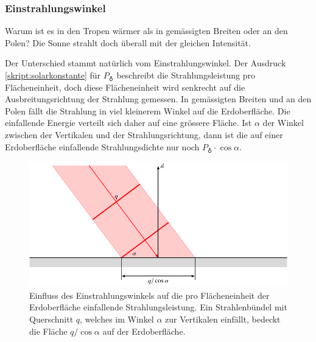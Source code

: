 \subsubsection{Einstrahlungswinkel}
Warum ist es in den Tropen wärmer als in gemässigten Breiten oder
an den Polen?
Die Sonne strahlt doch überall mit der gleichen Intensität.

Der Unterschied stammt natürlich vom Einstrahlungswinkel.
Der Ausdruck \eqref{skript:solarkonstante} für $P_{\earth}$ 
beschreibt die Strahlungsleistung pro Flächeneinheit, doch diese
Flächeneinheit wird senkrecht auf die Ausbreitungsrichtung der
Strahlung gemessen.
In gemässigten Breiten und an den Polen fällt die Strahlung 
in viel kleinerem Winkel auf die Erdoberfläche.
Die einfallende Energie verteilt sich daher auf eine grössere
Fläche.
Ist $\alpha$ der Winkel zwischen der Vertikalen und der Strahlungsrichtung,
dann ist die auf einer Erdoberfläche einfallende Strahlungsdichte nur
noch $P_{\earth}\cdot\cos\alpha$.

\begin{figure}
\centering
\includegraphics{chapters/1/einfall.pdf}
\caption{Einfluss des Einstrahlungswinkels auf die pro Flächeneinheit
der Erdoberfläche einfallende Strahlungsleistung.
Ein Strahlenbündel mit Querschnitt $q$, welches im Winkel
$\alpha$ zur Vertikalen einfällt, bedeckt die Fläche $q/\cos\alpha$
auf der Erdoberfläche.
\label{skript:einfallswinkel}}
\end{figure}

